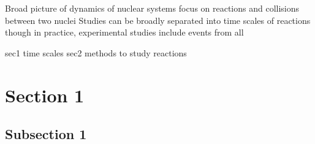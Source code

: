 Broad picture of dynamics of nuclear systems
focus on reactions and collisions between two nuclei
Studies can be broadly separated into time scales of reactions
though in practice, experimental studies include events from all

sec1 time scales
sec2 methods to study reactions




\section{Section 1}\label{sec:ch_1_sec_1}

\subsection{Subsection 1}\label{subsec:subsec_1.1.1}


\clearpage
